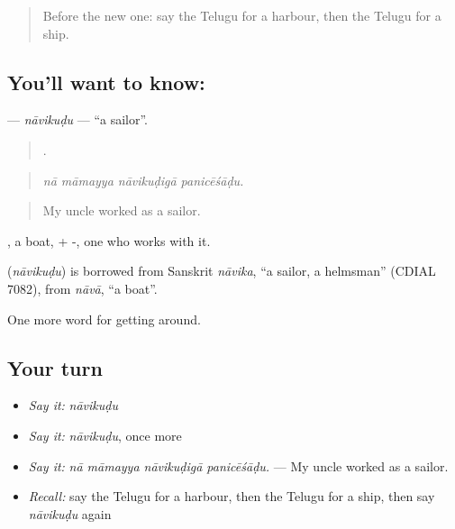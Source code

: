 \label{lesson:TE-C452-navikudu}



\begin{quote}
Before the new one: say the Telugu for a harbour, then the Telugu for a ship.
\end{quote}

\subsection*{You'll want to know: }
\textbf{} — \emph{nāvikuḍu} — \textquotedblleft{}a sailor\textquotedblright{}.

\begin{quote}
   .
\end{quote}

\begin{quote}
\emph{nā māmayya nāvikuḍigā panicēśāḍu.}
\end{quote}

\begin{quote}
My uncle worked as a sailor.
\end{quote}

, a boat, + -, one who works with it.

\begin{cousinweb}
\textbf{} (\emph{nāvikuḍu}) is borrowed from Sanskrit \emph{nāvika}, \textquotedblleft{}a sailor, a helmsman\textquotedblright{} (CDIAL 7082), from \emph{nāvā}, \textquotedblleft{}a boat\textquotedblright{}.
\end{cousinweb}

\begin{grammarlens}[title={What you've built}]
One more word for getting around.
\end{grammarlens}

\subsection*{Your turn}
\begin{itemize}
\raggedright
  \item \emph{Say it:} \emph{nāvikuḍu}
  \item \emph{Say it:} \emph{nāvikuḍu}, once more
  \item \emph{Say it:} \emph{nā māmayya nāvikuḍigā panicēśāḍu.} — My uncle worked as a sailor.
  \item \emph{Recall:} say the Telugu for a harbour, then the Telugu for a ship, then say \emph{nāvikuḍu} again
\end{itemize}

